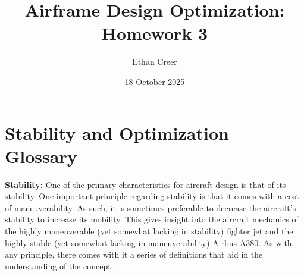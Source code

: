 \documentclass{article}
\title{Airframe Design Optimization: Homework 3}
\author{Ethan Creer}
\date{18 October 2025}
\begin{document}
\maketitle
\section{Stability and Optimization Glossary}
\textbf{Stability:} One of the primary characteristics for aircraft design is that of its stability. One important principle regarding stability is that it comes with a cost of maneuverability.
As such, it is sometimes preferable to decrease the aircraft's stability to increase its mobility. This gives insight into the aircraft mechanics of the highly maneuverable (yet somewhat lacking in stability) fighter jet
and the highly stable (yet somewhat lacking in maneuverability) Airbus A380. As with any principle, there comes with it a series of definitions that aid in the understanding of the concept.
\end{document}
